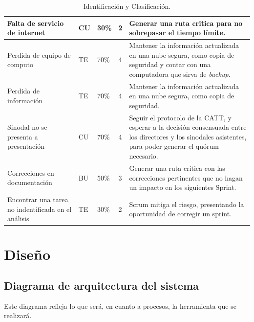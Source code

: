 \documentclass[10pt]{article}
\begin{document}
\begin{table}[htbp]
\begin{center}
\begin{tabular}{|p{2.2cm}|p{2.2cm}|p{2.2cm}|p{2.2cm}|p{2.2cm}|}
\hline
Falta de servicio de internet & CU & 30\% & 2 & Generar una ruta critica para no sobrepasar el tiempo límite. \\
\hline
Perdida de equipo de computo & TE & 70\% & 4 & Mantener la información actualizada en una nube segura, como copia de seguridad y contar con una computadora que sirva de \textit{backup}. \\
\hline
Perdida de información & TE & 70\% & 4 & Mantener la información actualizada en una nube segura, como copia de seguridad. \\
\hline
Sinodal no se presenta a presentación &CU & 70\% & 4 & Seguir el protocolo de la CATT, y esperar a la decisión consensuada entre los directores y los sinodales asistentes, para poder generar el quórum necesario. \\
\hline
Correcciones en documentación  & BU & 50\% & 3 & Generar una ruta critica con las correcciones pertinentes que no hagan un impacto en los siguientes Sprint. \\
\hline
Encontrar una tarea no indentificada en el análisis & TE & 30\% & 2 & Scrum mitiga el riesgo, presentando la oportunidad de corregir un sprint. \\
\hline
\end{tabular}
\caption{Identificación y Clasificación.}
\label{tabla2}
\end{center}
\end{table}



\newpage

\section{Diseño}

\subsection{Diagrama de arquitectura del sistema}

Este diagrama refleja lo que será, en cuanto a procesos, la herramienta que se realizará.
\end{document}
